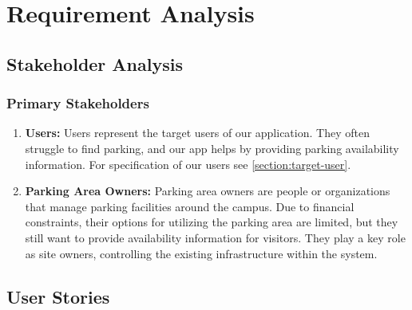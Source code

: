 
\newcommand{\userstory}[4]{%
    \refstepcounter{nuserstory}
    \subsection{#1}
    \label{userstory:\thenuserstory}
    \hangindent=40pt
    \textbf{\textit{As a}} #2,\\
    \textbf{\textit{I want to}} #3,\\
    \textbf{\textit{so that}} #4.
}


\chapter{Requirement Analysis}
\label{chap:requirement-analysis}

\section{Stakeholder Analysis}
\label{section:stakeholder-analysis}
\subsection{Primary Stakeholders}
\label{subsection:primary-stakeholders}

\begin{enumerate}[leftmargin=80pt]
    \item \textbf{Users:} Users represent the target users of our application. They often struggle to find parking, and our app helps by providing parking availability information. For specification of our users see \ref{section:target-user}.
    \item \textbf{Parking Area Owners:} Parking area owners are people or organizations that manage parking facilities around the campus. Due to financial constraints, their options for utilizing the parking area are limited, but they still want to provide availability information for visitors. They play a key role as site owners, controlling the existing infrastructure within the system.
\end{enumerate}

\section{User Stories}
\label{section:user-stories}


